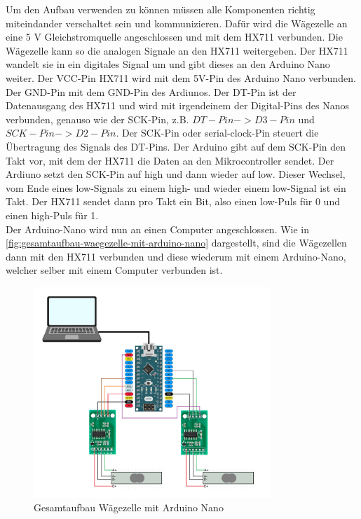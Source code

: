 \clearpage
\noindent
Um den Aufbau verwenden zu können müssen alle Komponenten richtig miteindander verschaltet sein und kommunizieren.
Dafür wird die Wägezelle an eine 5 V Gleichstromquelle angeschlossen und mit dem HX711 verbunden.
Die Wägezelle kann so die analogen Signale an den HX711 weitergeben.
Der HX711 wandelt sie in ein digitales Signal um und gibt dieses an den Arduino Nano weiter.
Der VCC-Pin HX711 wird mit dem 5V-Pin des Arduino Nano verbunden.
Der GND-Pin mit dem GND-Pin des Ardiunos.
Der DT-Pin ist der Datenausgang des HX711 und wird mit irgendeinem der Digital-Pins des Nanos verbunden, genauso wie der SCK-Pin, z.B. $DT-Pin -> D3-Pin$ und $SCK-Pin -> D2-Pin$.
Der SCK-Pin oder serial-clock-Pin steuert die Übertragung des Signals des DT-Pins.
Der Arduino gibt auf dem SCK-Pin den Takt vor, mit dem der HX711 die Daten an den Mikrocontroller sendet.
Der Ardiuno setzt den SCK-Pin auf high und dann wieder auf low.
Dieser Wechsel, vom Ende eines low-Signals zu einem high- und wieder einem low-Signal ist ein Takt.
Der HX711 sendet dann pro Takt ein Bit, also einen low-Puls für 0 und einen high-Puls für 1.
\\
Der Arduino-Nano wird nun an einen Computer angeschlossen.
Wie in \autoref{fig:gesamtaufbau-waegezelle-mit-arduino-nano} dargestellt, sind die Wägezellen dann mit den HX711 verbunden und diese wiederum mit einem Arduino-Nano, welcher selber mit einem Computer verbunden ist.
\begin{figure}[h!]
    \centering
    \includegraphics[width=0.8\textwidth]{img/Schaltungs-Aufbau.png}
    \caption{Gesamtaufbau Wägezelle mit Arduino Nano}
    \label{fig:gesamtaufbau-waegezelle-mit-arduino-nano}
\end{figure}
